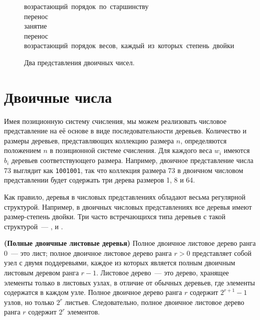 \begin{figure}
  \centering

  \mbox{возрастающий порядок по старшинству}\\
  \mbox{перенос}\\
  \mbox{занятие}\\
  \mbox{перенос}\\
  \mbox{возрастающий порядок весов, каждый из которых степень двойки}\\

  \caption{Два представления двоичных чисел.}
  \label{fig:9.1}
\end{figure}

\section{Двоичные числа}
\label{sc:9.2}

Имея позиционную систему счисления, мы можем реализовать числовое
представление на её основе в виде последовательности
деревьев. Количество и размеры деревьев, представляющих коллекцию
размера $n$, определяются положением $n$ в позиционной системе
счисления. Для каждого веса $w_i$ имеются $b_i$ деревьев
соответствующего размера. Например, двоичное представление числа 73
выглядит как \texttt{1001001}, так что коллекция размера 73 в двоичном
числовом представлении будет содержать три дерева размеров 1, 8 и 64.

Как правило, деревья в числовых представлениях обладают весьма
регулярной структурой. Например, в двоичных числовых представлениях
все деревья имеют размер-степень двойки. Три часто встречающихся типа
деревьев с такой структурой~---  \cite{KaldewaijDielissen1996},  \cite{Vuillemin1978} и
 \cite{SackStrothotte1990}.

\begin{definition}
  \textbf{(Полные двоичные листовые деревья)} Полное двоичное листовое
  дерево ранга 0~--- это лист; полное двоичное листовое дерево ранга
  $r > 0$ представляет собой узел с двумя поддеревьями, каждое из
  которых является полным двоичным листовым деревом ранга $r -
  1$. Листовое дерево~--- это дерево, хранящее элементы только в
  листовых узлах, в отличие от обычных деревьев, где элементы
  содержатся в каждом узле. Полное двоичное дерево ранга $r$ содержит
  $2^{r+1} - 1$ узлов, но только $2^r$ листьев. Следовательно, полное
  двоичное листовое дерево ранга $r$ содержит $2^r$ элементов.
\end{definition}

